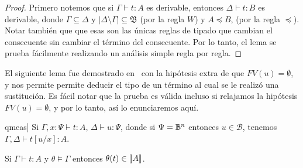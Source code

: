 \begin{proof}
  Primero notemos que si \( \Gamma \vdash t : A \) es derivable, entonces \( \Delta \vdash t : B \)
  es derivable, donde \( \Gamma \subseteq \Delta \) y
  \( |\Delta \setminus \Gamma| \subseteq \mathfrak{B} \) (por la regla \( W \)) y \( A \preceq B \), (por la regla \( \preceq \)). Notar también que que esas son las únicas reglas de tipado que cambian el consecuente sin cambiar el término del consecuente. Por lo tanto, el lema se prueba fácilmente realizando un análisis simple regla por regla.
\end{proof}

El siguiente lema fue demostrado en~\cite{qmeas} con la hipótesis extra de que \( FV(u) = \emptyset \), y nos permite permite deducir el tipo de un término al cual se le realizó una sustitución. Es fácil notar que la prueba es válida incluso si relajamos la hipótesis \( FV(u) = \emptyset \), y por lo tanto, así lo enunciaremos aquí.

\newcommand\citedsub{\cite[Lem. 4.3]{qmeas}}

\begin{lemma}[Sustitución, \citedsub]\label{lem:substitution}
  Si \( \Gamma, x : \Psi \vdash t : A \), \( \Delta  \vdash u : \Psi \), donde si \( \Psi = \mathbb{B}^n \) entonces \( u \in \mathcal{B} \), tenemos \( \Gamma,\Delta\vdash t[u/x] : A \).
\end{lemma}

\begin{lemma}[Adecuación]\label{lem:adequacy}
  Si \( \Gamma \vdash t:A \) y \( \theta \models \Gamma \) entonces \( \theta(t) \in \llbracket A\rrbracket \).
\end{lemma}

